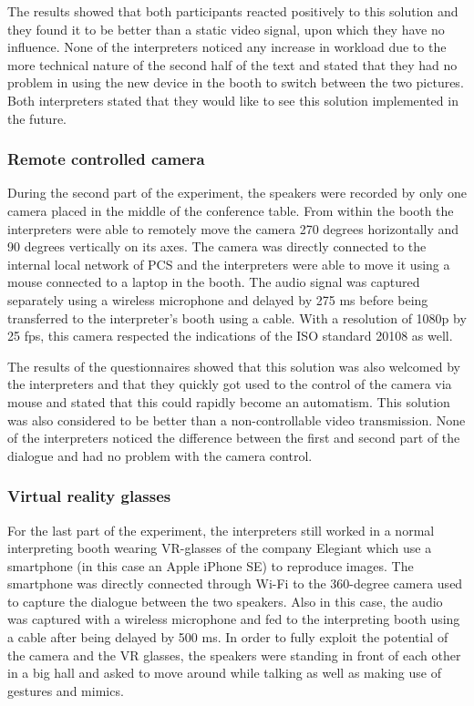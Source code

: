 \documentclass[output=paper]{langsci/langscibook}
\begin{document}
The results showed that both participants reacted positively to this solution and they found it to be better than a static video signal, upon which they have no influence. None of the interpreters noticed any increase in workload due to the more technical nature of the second half of the text and stated that they had no problem in using the new device in the booth to switch between the two pictures. Both interpreters stated that they would like to see this solution implemented in the future.

\subsubsection{Remote controlled camera}

During the second part of the experiment, the speakers were recorded by only one camera placed in the middle of the conference table. From within the booth the interpreters were able to remotely move the camera 270 degrees horizontally and 90 degrees vertically on its axes. The camera was directly connected to the internal local network of PCS and the interpreters were able to move it using a mouse connected to a laptop in the booth. The audio signal was captured separately using a wireless microphone and delayed by 275 ms before being transferred to the interpreter’s booth using a cable. With a resolution of 1080p by 25 fps, this camera respected the indications of the \textsc{ISO} standard 20108 as well. 

The results of the questionnaires showed that this solution was also welcomed by the interpreters and that they quickly got used to the control of the camera via mouse and stated that this could rapidly become an automatism. This solution was also considered to be better than a non-controllable video transmission. None of the interpreters noticed the difference between the first and second part of the dialogue and had no problem with the camera control.

\subsubsection{Virtual reality glasses}

For the last part of the experiment, the interpreters still worked in a normal interpreting booth wearing \textsc{VR}-glasses of the company Elegiant which use a smartphone (in this case an Apple iPhone SE) to reproduce images. The smartphone was directly connected through Wi-Fi to the 360-degree camera used to capture the dialogue between the two speakers. Also in this case, the audio was captured with a wireless microphone and fed to the interpreting booth using a cable after being delayed by 500 ms. In order to fully exploit the potential of the camera and the \textsc{VR} glasses, the speakers were standing in front of each other in a big hall and asked to move around while talking as well as making use of gestures and mimics.
\end{document}
